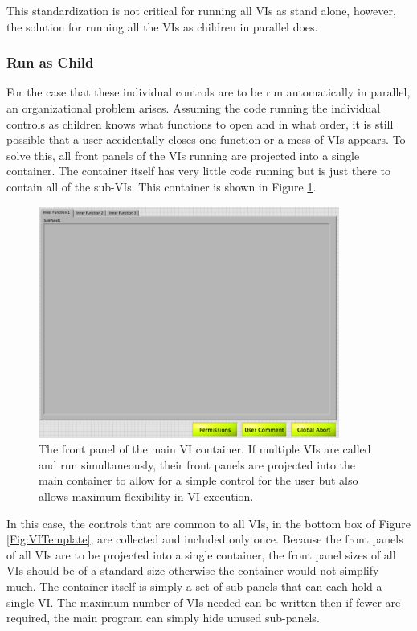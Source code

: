 This standardization is not critical for running all VIs as stand alone, however, the solution for running all the VIs as children in parallel does. 

\subsubsection{Run as Child}

For the case that these individual controls are to be run automatically in parallel, an organizational problem arises. Assuming the code running the individual controls as children knows what functions to open and in what order, it is still possible that a user accidentally closes one function or a mess of VIs appears. To solve this, all front panels of the VIs running are projected into a single container. The container itself has very little code running but is just there to contain all of the sub-VIs. This container is shown in Figure \ref{Fig:VIContainer}.

\begin{figure}[!h]\centering
\includegraphics[height=3in]{Figures/MainVIContainer.pdf}
\caption{The front panel of the main VI container. If multiple VIs are called and run simultaneously, their front panels are projected into the main container to allow for a simple control for the user but also allows maximum flexibility in VI execution.}\label{Fig:VIContainer}
\end{figure}

In this case, the controls that are common to all VIs, in the bottom box of Figure \ref{Fig:VITemplate}, are collected and included only once. Because the front panels of all VIs are to be projected into a single container, the front panel sizes of all VIs should be of a standard size otherwise the container would not simplify much. The container itself  is simply a set of sub-panels that can each hold a single VI. The maximum number of VIs needed can be written then if fewer are required, the main program can simply hide unused sub-panels. 

